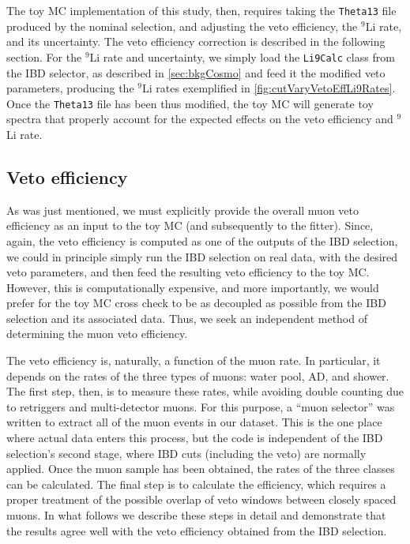 \documentclass[../thesis.tex]{subfiles}
\begin{document}
The toy MC implementation of this study, then, requires taking the \texttt{Theta13} file produced by the nominal selection, and adjusting the veto efficiency, the $^9$Li rate, and its uncertainty. The veto efficiency correction is described in the following section. For the $^9$Li rate and uncertainty, we simply load the \texttt{Li9Calc} class from the IBD selector, as described in \autoref{sec:bkgCosmo} and feed it the modified veto parameters, producing the $^9$Li rates exemplified in \autoref{fig:cutVaryVetoEffLi9Rates}. Once the \texttt{Theta13} file has been thus modified, the toy MC will generate toy spectra that properly account for the expected effects on the veto efficiency and $^9$Li rate.

\subsection{Veto efficiency}%
\label{sec:cutVaryMuVetoEff}

As was just mentioned, we must explicitly provide the overall muon veto efficiency as an input to the toy MC (and subsequently to the fitter). Since, again, the veto efficiency is computed as one of the outputs of the IBD selection, we could in principle simply run the IBD selection on real data, with the desired veto parameters, and then feed the resulting veto efficiency to the toy MC. However, this is computationally expensive, and more importantly, we would prefer for the toy MC cross check to be as decoupled as possible from the IBD selection and its associated data. Thus, we seek an independent method of determining the muon veto efficiency.

The veto efficiency is, naturally, a function of the muon rate. In particular, it depends on the rates of the three types of muons: water pool, AD, and shower. The first step, then, is to measure these rates, while avoiding double counting due to retriggers and multi-detector muons. For this purpose, a ``muon selector'' was written to extract all of the muon events in our dataset. This is the one place where actual data enters this process, but the code is independent of the IBD selection's second stage, where IBD cuts (including the veto) are normally applied. Once the muon sample has been obtained, the rates of the three classes can be calculated. The final step is to calculate the efficiency, which requires a proper treatment of the possible overlap of veto windows between closely spaced muons. In what follows we describe these steps in detail and demonstrate that the results agree well with the veto efficiency obtained from the IBD selection.
\end{document}
